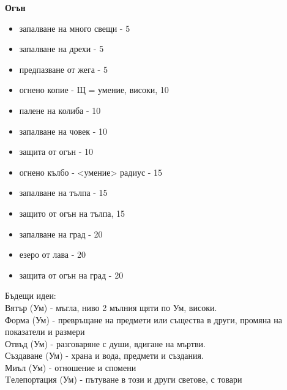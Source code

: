\vspace{1cm}
\textbf{Огън}  \\
\begin{itemize}
  \item{запалване на много свещи - 5}
  \item{запалване на дрехи - 5}
  \item{предпазване от жега - 5}
  \item{огнено копие - Щ = умение, високи, 10}
  \item{палене на колиба - 10}
  \item{запалване на човек - 10}
  \item{защита от огън - 10}
  \item{огнено кълбо - <умение> радиус - 15}
  \item{запалване на тълпа - 15}
  \item{защито от огън на тълпа, 15}
  \item{запалване на град - 20}
  \item{езеро от лава - 20}
  \item{защита от огън на град - 20}
\end{itemize}

Бъдещи идеи:  \\
Вятър (Ум)        - мъгла, ниво 2 мълния щяти по Ум, високи.                                         \\
Форма (Ум)        - превръщане на предмети или същества в други, промяна на показатели и размери     \\
Отвъд (Ум)        - разговаряне с души, вдигане на мъртви.                                           \\
Създаване (Ум)    - храна и вода, предмети и създания.                                               \\
Миъл (Ум)         - отношение и спомени                                                              \\
Tелепортация (Ум) - пътуване в този и други светове, с товари                                        \\






